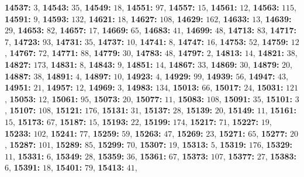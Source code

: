 \textsf{\bfseries 14537:} $3$, \textsf{\bfseries 14543:} $35$, \textsf{\bfseries 14549:} $18$, \textsf{\bfseries 14551:} $97$, \textsf{\bfseries 14557:} $15$, \textsf{\bfseries 14561:} $12$, \textsf{\bfseries 14563:} $115$, \textsf{\bfseries 14591:} $9$, \textsf{\bfseries 14593:} $132$, \textsf{\bfseries 14621:} $18$, \textsf{\bfseries 14627:} $108$, \textsf{\bfseries 14629:} $162$, \textsf{\bfseries 14633:} $13$, \textsf{\bfseries 14639:} $29$, \textsf{\bfseries 14653:} $82$, \textsf{\bfseries 14657:} $17$, \textsf{\bfseries 14669:} $65$, \textsf{\bfseries 14683:} $41$, \textsf{\bfseries 14699:} $48$, \textsf{\bfseries 14713:} $83$, \textsf{\bfseries 14717:} $7$, \textsf{\bfseries 14723:} $93$, \textsf{\bfseries 14731:} $35$, \textsf{\bfseries 14737:} $10$, \textsf{\bfseries 14741:} $8$, \textsf{\bfseries 14747:} $16$, \textsf{\bfseries 14753:} $52$, \textsf{\bfseries 14759:} $12$, \textsf{\bfseries 14767:} $72$, \textsf{\bfseries 14771:} $88$, \textsf{\bfseries 14779:} $30$, \textsf{\bfseries 14783:} $48$, \textsf{\bfseries 14797:} $2$, \textsf{\bfseries 14813:} $14$, \textsf{\bfseries 14821:} $38$, \textsf{\bfseries 14827:} $173$, \textsf{\bfseries 14831:} $8$, \textsf{\bfseries 14843:} $9$, \textsf{\bfseries 14851:} $14$, \textsf{\bfseries 14867:} $33$, \textsf{\bfseries 14869:} $30$, \textsf{\bfseries 14879:} $20$, \textsf{\bfseries 14887:} $38$, \textsf{\bfseries 14891:} $4$, \textsf{\bfseries 14897:} $10$, \textsf{\bfseries 14923:} $4$, \textsf{\bfseries 14929:} $99$, \textsf{\bfseries 14939:} $56$, \textsf{\bfseries 14947:} $43$, \textsf{\bfseries 14951:} $21$, \textsf{\bfseries 14957:} $12$, \textsf{\bfseries 14969:} $3$, \textsf{\bfseries 14983:} $134$, \textsf{\bfseries 15013:} $66$, \textsf{\bfseries 15017:} $24$, \textsf{\bfseries 15031:} $121$, \textsf{\bfseries 15053:} $12$, \textsf{\bfseries 15061:} $95$, \textsf{\bfseries 15073:} $20$, \textsf{\bfseries 15077:} $11$, \textsf{\bfseries 15083:} $108$, \textsf{\bfseries 15091:} $35$, \textsf{\bfseries 15101:} $3$, \textsf{\bfseries 15107:} $108$, \textsf{\bfseries 15121:} $176$, \textsf{\bfseries 15131:} $31$, \textsf{\bfseries 15137:} $28$, \textsf{\bfseries 15139:} $20$, \textsf{\bfseries 15149:} $11$, \textsf{\bfseries 15161:} $15$, \textsf{\bfseries 15173:} $67$, \textsf{\bfseries 15187:} $15$, \textsf{\bfseries 15193:} $22$, \textsf{\bfseries 15199:} $174$, \textsf{\bfseries 15217:} $71$, \textsf{\bfseries 15227:} $19$, \textsf{\bfseries 15233:} $102$, \textsf{\bfseries 15241:} $77$, \textsf{\bfseries 15259:} $59$, \textsf{\bfseries 15263:} $47$, \textsf{\bfseries 15269:} $23$, \textsf{\bfseries 15271:} $65$, \textsf{\bfseries 15277:} $20$, \textsf{\bfseries 15287:} $101$, \textsf{\bfseries 15289:} $85$, \textsf{\bfseries 15299:} $70$, \textsf{\bfseries 15307:} $19$, \textsf{\bfseries 15313:} $5$, \textsf{\bfseries 15319:} $176$, \textsf{\bfseries 15329:} $11$, \textsf{\bfseries 15331:} $6$, \textsf{\bfseries 15349:} $28$, \textsf{\bfseries 15359:} $36$, \textsf{\bfseries 15361:} $67$, \textsf{\bfseries 15373:} $107$, \textsf{\bfseries 15377:} $27$, \textsf{\bfseries 15383:} $6$, \textsf{\bfseries 15391:} $18$, \textsf{\bfseries 15401:} $79$, \textsf{\bfseries 15413:} $41$, 
